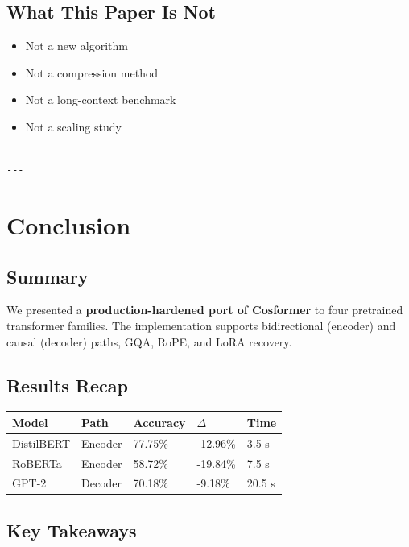 \subsection{What This Paper Is Not}

\begin{itemize}
\item Not a new algorithm
\item Not a compression method
\item Not a long-context benchmark
\item Not a scaling study
\end{itemize}
\begin{lstlisting}

---
\end{lstlisting}


\section{Conclusion}

\subsection{Summary}

We presented a \textbf{production-hardened port of Cosformer} to four pretrained 
transformer families. The implementation supports bidirectional (encoder) 
and causal (decoder) paths, GQA, RoPE, and LoRA recovery.

\subsection{Results Recap}

\begin{table}[H]
\centering
\small
\begin{tabular}{lllll}
\toprule
\textbf{Model} & \textbf{Path} & \textbf{Accuracy} & \textbf{$\Delta$} & \textbf{Time} \\
\midrule
DistilBERT & Encoder & 77.75\% & -12.96\% & 3.5 s \\
RoBERTa & Encoder & 58.72\% & -19.84\% & 7.5 s \\
GPT-2 & Decoder & 70.18\% & -9.18\% & 20.5 s \\
\bottomrule
\end{tabular}
\end{table}

\subsection{Key Takeaways}

